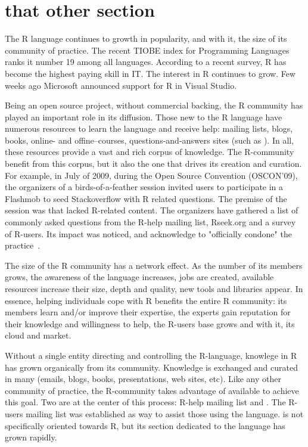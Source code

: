 \section{that other section}

The R language continues to growth in popularity, and with it, the size of its community of practice. The recent TIOBE index for Programming Languages ranks it
number 19 among all languages.  According to a recent survey, R has become the highest paying skill in IT. The interest in R continues to grow. Few weeks ago
Microsoft announced support for R in Visual Studio\cite{r-microsot}.

Being an open source project, without commercial backing, the R community has played an important role in its diffusion. Those new to the R language have
numerous resources to learn the language and receive help: mailing lists, blogs, books, online- and offine--courses, questions-and-answers sites (such as
\SO). In all, these resources provide a vast and rich corpus of knowledge. The R-community benefit from this corpus, but it also the one that drives its
creation and curation.  For example, in July of 2009, during the Open Source Convention (OSCON'09), the organizers of a birds-of-a-feather session invited users
to participate in a Flashmob to seed Stackoverflow with R related questions\cite{rflashmob09}. The premise of the session was that \SO lacked R-related
content. The organizers have gathered a list of commonly asked questions from the R-help mailing list, Rseek.org and a survey of R-users. Its impact was
noticed, and \SO acknowledge to "officially condone" the practice~\cite{soFlashmob09}.

The size of the R community has a network effect. As the number of its members grows, the awareness of the language increases, jobs are created, available
resources increase their size, depth and quality, new tools and libraries appear. In essence, helping individuals cope with R benefits the entire R
community: its members learn and/or improve their expertise, the experts gain reputation for their knowledge and willingness to help, the R-users base grows and
with it, its cloud and market.

Without a single entity directing and controlling the R-language, knowlege in R has grown organically from its community. Knowledge is exchanged and curated in
many \channels (emails, blogs, books, presentations, web sites, etc). Like any other community of practice, the R-community takes advantage of available \channels
to achieve this goal.
Two \channels are at the center of this process: R-help mailing list and \SO. The R-users mailing list was established  as way to assist those using
the language. \SO is not specifically oriented towards R, but its section dedicated to the language has grown rapidly.

